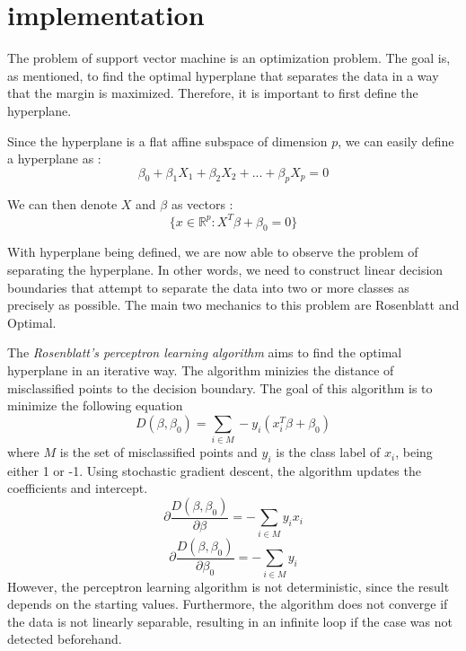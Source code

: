 \section{implementation}
The problem of support vector machine is an optimization problem. The goal is, as mentioned, 
to find the optimal hyperplane that separates the data in a way that the margin is maximized.
Therefore, it is important to first define the hyperplane.

Since the hyperplane is a flat affine subspace of dimension $p$, we can easily define a hyperplane as \cite{R9}: 
\begin{equation}
    \beta_0 + \beta_1X_1 + \beta_2X_2 + ... + \beta_pX_p = 0
\end{equation}

We can then denote $X$ and $\beta$ as vectors \cite{Elements12}: 
\begin{equation}
    \{x \in \mathbb{R}^p: X^T \beta + \beta_0 = 0\}
\end{equation}

With hyperplane being defined, we are now able to observe the problem of separating the hyperplane. 
In other words, we need to construct linear decision
boundaries that attempt to separate the data into two or more classes as precisely as possible. 
The main two mechanics to this problem are Rosenblatt and Optimal.

The \emph{Rosenblatt's perceptron learning algorithm} aims to find the optimal hyperplane in an iterative way. The algorithm minizies
the distance of misclassified points to the decision boundary. The goal of this algorithm is to minimize the following equation
\begin{equation}
    D(\beta, \beta_0) = \sum_{i\in M} -y_i(x_i^T \beta + \beta_0)
\end{equation}
where $M$ is the set of misclassified points and $y_i$ is the class label of $x_i$, being either 1 or -1. Using stochastic gradient
descent, the algorithm updates the coefficients and intercept. 
\begin{equation}
    \partial\frac{D(\beta, \beta_0)}{\partial\beta} = -\sum_{i\in M} y_ix_i
\end{equation}
\begin{equation}
    \partial\frac{D(\beta, \beta_0)}{\partial\beta_0} = -\sum_{i\in M} y_i
\end{equation}
However, the perceptron learning algorithm is not deterministic, since
the result depends on the starting values. Furthermore, the algorithm does not converge if the data is not linearly separable, resulting
in an infinite loop if the case was not detected beforehand. \cite{Elements4}

